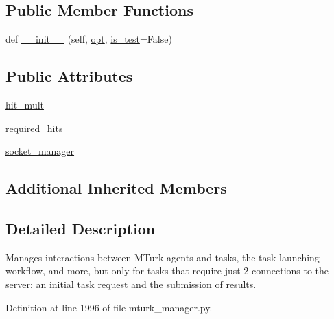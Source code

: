 \subsection*{Public Member Functions}
\begin{DoxyCompactItemize}
\item 
def \hyperlink{classparlai_1_1mturk_1_1core_1_1mturk__manager_1_1StaticMTurkManager_ab5bd9c520d5aefcb52031fb8c0d2f4bc}{\+\_\+\+\_\+init\+\_\+\+\_\+} (self, \hyperlink{classparlai_1_1mturk_1_1core_1_1mturk__manager_1_1MTurkManager_a1167cb8359db58221b2843554731cf1b}{opt}, \hyperlink{classparlai_1_1mturk_1_1core_1_1mturk__manager_1_1MTurkManager_aba2c8855ba4baadd54a42a834aaf75bd}{is\+\_\+test}=False)
\end{DoxyCompactItemize}
\subsection*{Public Attributes}
\begin{DoxyCompactItemize}
\item 
\hyperlink{classparlai_1_1mturk_1_1core_1_1mturk__manager_1_1StaticMTurkManager_ae5ea8ccfb26e3ea55357bf4f34edef27}{hit\+\_\+mult}
\item 
\hyperlink{classparlai_1_1mturk_1_1core_1_1mturk__manager_1_1StaticMTurkManager_aa41b3c50a7fe1b11a022b8d6877b5e65}{required\+\_\+hits}
\item 
\hyperlink{classparlai_1_1mturk_1_1core_1_1mturk__manager_1_1StaticMTurkManager_ad705fb400223ca7f2e9c9b2026a04d07}{socket\+\_\+manager}
\end{DoxyCompactItemize}
\subsection*{Additional Inherited Members}


\subsection{Detailed Description}
\begin{DoxyVerb}Manages interactions between MTurk agents and tasks, the task launching workflow,
and more, but only for tasks that require just 2 connections to the server: an
initial task request and the submission of results.
\end{DoxyVerb}
 

Definition at line 1996 of file mturk\+\_\+manager.\+py.




